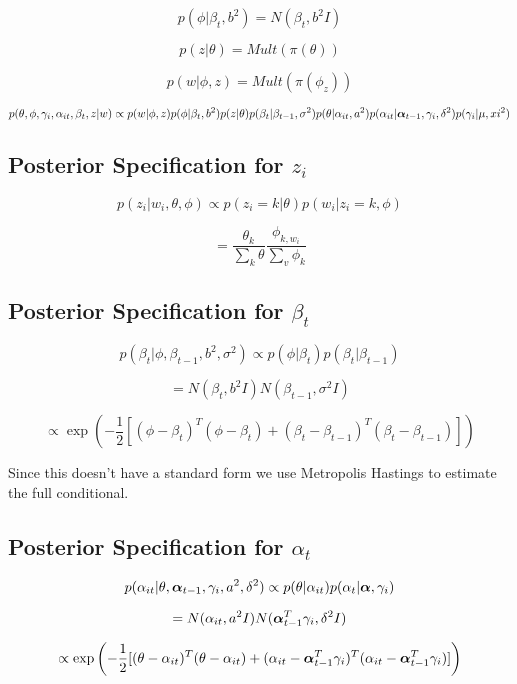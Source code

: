 \documentclass[a4paper]{article}
\begin{document}
\[p(\phi | \beta_t, b^2) = N(\beta_t, b^2I)\]

\[p(z| \theta) = Mult(\pi(\theta))\]

\[p(w | \phi, z) = Mult(\pi(\phi_z))\]

\[p(\theta, \phi, \gamma_i, \alpha_{it}, \beta_t, z | w) \propto p(w | \phi, z) p(\phi |  \beta_t, b^2)  p(z | \theta)  p(\beta_t | \beta_{t-1}, \sigma^2) p(\theta | \alpha_{it}, a^2) p(\alpha_{it} | \text{\boldmath$\alpha$}_{t-1}, \gamma_i, \delta^2) p(\gamma_i | \mu, xi^2)\]

\subsection{Posterior Specification for $z_i$}

\[p(z_i | w_i, \theta, \phi) \propto p(z_i = k | \theta) p(w_i | z_i = k, \phi)\]

\[= \frac{\theta_k}{\sum_k \theta} \frac{\phi_{k, w_i}}{\sum_v \phi_k}\]

\subsection{Posterior Specification for $\beta_t$}

\[p(\beta_t | \phi, \beta_{t-1}, b^2, \sigma^2) \propto p(\phi | \beta_t) p(\beta_t | \beta_{t-1})\]

\[= N(\beta_t, b^2I) N(\beta_{t-1}, \sigma^2I)\]

\[\propto \exp{\left(-\frac{1}{2}[(\phi - \beta_t)^T(\phi - \beta_t) + (\beta_t - \beta_{t-1})^T(\beta_t - \beta_{t-1})]\right)}\]

Since this doesn't have a standard form we use Metropolis Hastings to estimate the full conditional.

\subsection{Posterior Specification for $\alpha_t$}

\[p(\alpha_{it} | \theta, \text{\boldmath$\alpha$}_{t-1}, \gamma_i, a^2, \delta^2) \propto p(\theta | \alpha_{it}) p(\alpha_t | \text{\boldmath$\alpha$}, \gamma_i)\]

\[= N(\alpha_{it}, a^2I) N(\text{\boldmath$\alpha$}_{t-1}^T \gamma_i, \delta^2I)\]

\[\propto \exp{\left(-\frac{1}{2}[(\theta - \alpha_{it})^T(\theta - \alpha_{it}) + (\alpha_{it} - \text{\boldmath$\alpha$}_{t-1}^T \gamma_i)^T(\alpha_{it} - \text{\boldmath$\alpha$}_{t-1}^T \gamma_i)]\right)}\]
\end{document}
